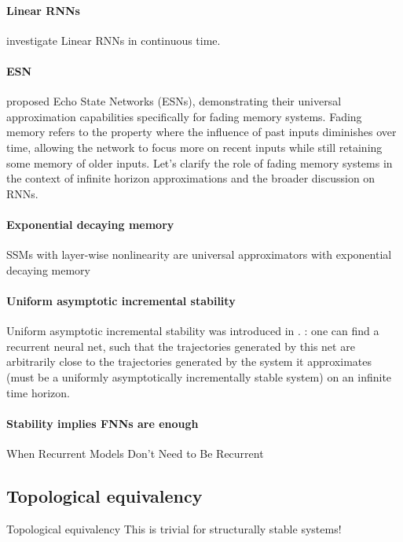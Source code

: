 \documentclass{article}
\theoremstyle{definition}
\theoremstyle{remark}
\begin{document}
\paragraph{Linear RNNs}
\citet{li2020curse} investigate Linear RNNs in continuous time. %
 
 \citep{li2022approximation}

\paragraph{ESN}
 \citet{jaeger2001echo} proposed Echo State Networks (ESNs), demonstrating their universal approximation capabilities specifically for fading memory systems.
Fading memory refers to the property where the influence of past inputs diminishes over time, allowing the network to focus more on recent inputs while still retaining some memory of older inputs.
 Let’s clarify the role of fading memory systems in the context of infinite horizon approximations and the broader discussion on RNNs.
 
 
\paragraph{Exponential decaying memory}%
SSMs with layer-wise nonlinearity are universal approximators with exponential decaying memory \citep{wang2024state}

\citep{dubinin2024fading}

\paragraph{Uniform asymptotic incremental stability}
Uniform asymptotic incremental stability was introduced in \citep{pavlov2006uniform}.
\citep{hanson2020universal}: one can find a recurrent neural net, such that the trajectories generated by this net are arbitrarily close to the trajectories generated by the system it approximates (must be a uniformly asymptotically incrementally stable system) on an infinite time horizon.


\paragraph{Stability implies FNNs are enough}%
When Recurrent Models Don't Need to Be Recurrent \citep{miller2018stable}


\subsection{Topological equivalency}
Topological equivalency \citep{hart2020embedding}
This is trivial for structurally stable systems!
\end{document}
